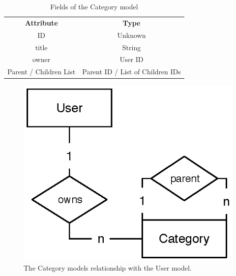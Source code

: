 			\begin{table}[p]
				\centering
				\begin{tabular}{c|c}
					\textbf{Attribute} 		& \textbf{Type} 		\\
					ID 						& Unknown 	\\
					title 					& String 	\\
					owner 					& User ID 	\\
					Parent / Children List 	& Parent ID / List of Children IDs 	\\
				\end{tabular}
				\caption{Fields of the Category model}
				\label{fig:model:category}
			\end{table}
			\begin{figure}[p]
				\centering
				\includegraphics[scale=0.75]{figures/design/uml/erd/user-category.eps}
				\caption{The Category models relationship with the User model.}
				\label{fig:relationship:category-user}
			\end{figure}



